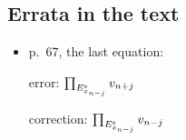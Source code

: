 \documentclass[a4paper,11pt,fleqn]{article}
\begin{document}
\maketitle
\subsection*{Errata in the text}
\begin{itemize}
    \item p.~67, the last equation: 

    error: $\prod_{E^{\rm s}_{x_{n-j}}}v_{n+j}$

    correction: $\prod_{E^{\rm s}_{x_{n-j}}}v_{n-j}$
\end{itemize}
\hruleskip
\end{document}
